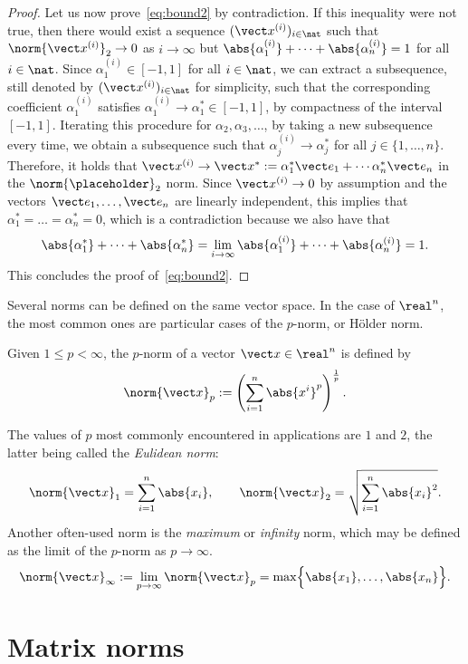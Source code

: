 \begin{proof}
    Let us now prove~\eqref{eq:bound2} by contradiction.
    If this inequality were not true,
    then there would exist a sequence $(\vect x^{(i)})_{i \in \nat}$ such
    that~$\norm{\vect x^{(i)}}_2 \to 0$ as $i \to \infty$ but $\abs{\alpha_1^{(i)}} + \dotsb + \abs{\alpha_n^{(i)}} = 1$ for all $i \in \nat$.
    Since $\alpha_1^{(i)} \in [-1, 1]$ for all $i \in \nat$,
    we can extract a subsequence, still denoted by $(\vect x^{(i)})_{i \in \nat}$ for simplicity,
    such that the corresponding coefficient $\alpha_1^{(i)}$ satisfies $\alpha_1^{(i)} \to \alpha_1^* \in [-1, 1]$,
    by compactness of the interval~$[-1, 1]$.
    Iterating this procedure for $\alpha_2, \alpha_3, \dots$,
    by taking a new subsequence every time,
    we obtain a subsequence such that $\alpha^{(i)}_j \to \alpha_j^*$ for all $j \in \{1, \dotsc, n\}$.
    Therefore, it holds that $\vect x^{(i)} \to \vect x^* := \alpha_1^* \vect e_1 + \dotsb \alpha_n^* \vect e_n$ in the $\norm{\placeholder}_2$ norm.
    Since $\vect x^{(i)} \to 0$ by assumption and the vectors $\vect e_1, \dotsc, \vect e_n$ are linearly independent,
    this implies that $\alpha_1^* = \dots = \alpha_n^* = 0$,
    which is a contradiction because we also have that
    \[
        \abs{\alpha_1^*} + \dotsb + \abs{\alpha_n^*} = \lim_{i \to \infty} \abs{\alpha_1^{(i)}} + \dotsb + \abs{\alpha_n^{(i)}} = 1.
    \]
    This concludes the proof of~\eqref{eq:bound2}.
\end{proof}

Several norms can be defined on the same vector space.
In the case of $\real^n$,
the most common ones are particular cases of the $p$-norm, or H\"older norm.
\begin{definition}
    Given $1 \leq p < \infty$,
    the $p$-norm of a vector $\vect x \in \real^n$ is defined by
    \[
        \norm{\vect x}_p := \left( \sum_{i=1}^{n} \abs{x^i}^p \right)^{\frac{1}{p}}.
    \]
\end{definition}
The values of $p$ most commonly encountered in applications are $1$ and $2$,
the latter being called the \emph{Eulidean norm}:
\[
    \norm{\vect x}_1 = \sum_{i=1}^{n} \abs{x_i},
    \qquad
    \norm{\vect x}_2 = \sqrt{\sum_{i=1}^{n} \abs{x_i}^2}.
\]
Another often-used norm is the \emph{maximum} or \emph{infinity} norm,
which may be defined as the limit of the $p$-norm as $p \to \infty$.
\[
    \norm{\vect x}_{\infty}
    := \lim_{p \to \infty} \norm{\vect x}_p = \max \Bigl\{ \abs{x_1}, \dotsc, \abs{x_n} \Bigr\}.
\]

\section{Matrix norms}%
\label{sec:matrix_norms}

